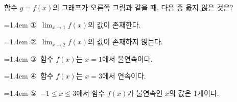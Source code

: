\noindent\begin{minipage}[t]{0.58\linewidth}\vspace{0pt}\raggedright 함수 $y=f(x)$의 그래프가 오른쪽 그림과 같을 때, 다음 중 옳지 \underline{않은} 것은?\end{minipage}\hfill\begin{minipage}[t]{0.4\linewidth}\vspace{0pt}\centering \resizebox{\ifdim\width>\linewidth\linewidth\else\width\fi}{!}{}\end{minipage}\par
\par\medskip\par\noindent\hangindent=1.4em {\small ①}\ $\displaystyle\lim_{x\to 1} f(x)$의 값이 존재한다.\par\noindent\hangindent=1.4em {\small ②}\ $\displaystyle\lim_{x\to 2} f(x)$의 값이 존재하지 않는다.\par\noindent\hangindent=1.4em {\small ③}\ 함수 $f(x)$는 $x=1$에서 불연속이다.\par\noindent\hangindent=1.4em {\small ④}\ 함수 $f(x)$는 $x=3$에서 연속이다.\par\noindent\hangindent=1.4em {\small ⑤}\ $-1\le x\le 3$에서 함수 $f(x)$가 불연속인 $x$의 값은 1개이다.\par\medskip

